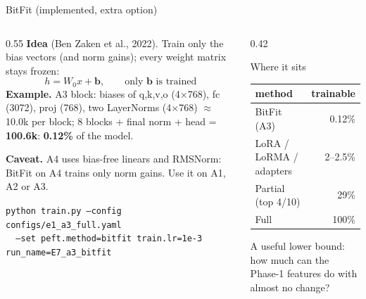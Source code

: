 \documentclass[aspectratio=169,11pt]{beamer}
\newcommand{\code}[1]{\texttt{\small #1}}
\begin{document}
\begin{frame}{BitFit (implemented, extra option)}
  \begin{columns}[T]
    \begin{column}{0.55\textwidth}
      \footnotesize
      \textbf{Idea} (Ben Zaken et al., 2022). Train only the bias vectors (and norm gains);
      every weight matrix stays frozen:
      $$h = W_0 x + \mathbf{b}, \qquad \text{only } \mathbf{b} \text{ is trained}$$
      \textbf{Example.} A3 block: biases of q,k,v,o (4$\times$768), fc (3072), proj (768),
      two LayerNorms (4$\times$768) $\approx$ 10.0k per block; 8 blocks + final norm + head
      = \textbf{100.6k}: \textbf{0.12\%} of the model.
      \vspace{1mm}

      \textbf{Caveat.} A4 uses bias-free linears and RMSNorm: BitFit on A4 trains only
      norm gains. Use it on A1, A2 or A3.
      \vspace{1mm}

      \code{python train.py --config configs/e1\_a3\_full.yaml}\\
      \code{\ \ --set peft.method=bitfit train.lr=1e-3 run\_name=E7\_a3\_bitfit}
    \end{column}
    \begin{column}{0.42\textwidth}
      \footnotesize
      \begin{block}{Where it sits}
        \begin{tabular}{@{}lr@{}}
          \toprule
          method & trainable \\
          \midrule
          BitFit (A3) & 0.12\% \\
          LoRA / LoRMA / adapters & 2--2.5\% \\
          Partial (top 4/10) & 29\% \\
          Full & 100\% \\
          \bottomrule
        \end{tabular}
      \end{block}
      A useful lower bound: how much can the Phase-1 features do with almost no change?
    \end{column}
  \end{columns}
\end{frame}
\end{document}
